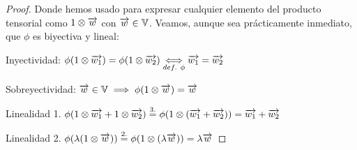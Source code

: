 \begin{ejemplo}
\begin{proof}
        Donde hemos usado  para expresar cualquier elemento del producto tensorial como $1 \otimes \overrightarrow{w}$ con $\overrightarrow{w} \in \mathbb{V}$. Veamos, aunque sea prácticamente inmediato, que $\phi$ es biyectiva y lineal:

        Inyectividad: $\phi(1 \otimes \overrightarrow{w_1}) = \phi(1 \otimes \overrightarrow{w_2}) \underset{def.\ \phi}{\Longleftrightarrow} \overrightarrow{w_1} = \overrightarrow{w_2}$

        Sobreyectividad: $\overrightarrow{w} \in \mathbb{V} \implies \phi(1 \otimes \overrightarrow{w}) = \overrightarrow{w}$

        Linealidad 1. $\phi(1 \otimes \overrightarrow{w_1} + 1 \otimes \overrightarrow{w_2}) \stackrel{\text{3.}}{=} \phi(1 \otimes (\overrightarrow{w_1} + \overrightarrow{w_2})) = \overrightarrow{w_1} + \overrightarrow{w_2}$

        Linealidad 2. $\phi(\lambda (1 \otimes \overrightarrow{w})) \stackrel{\text{2.}}{=} \phi(1 \otimes (\lambda \overrightarrow{w})) = \lambda \overrightarrow{w}$

    \end{proof}
\end{ejemplo}

